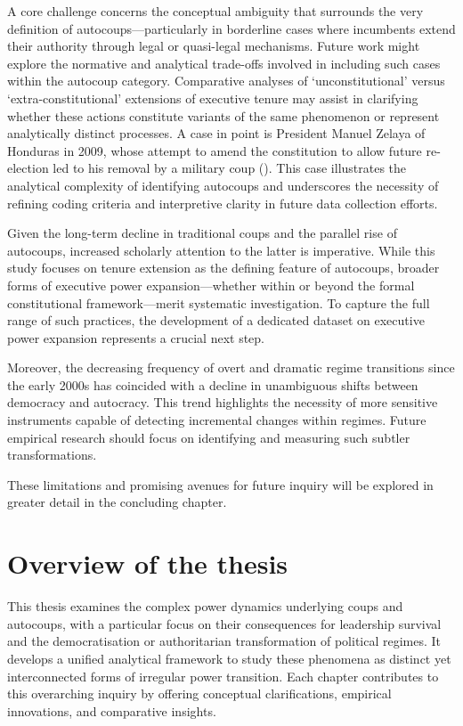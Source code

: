 \documentclass[
  12pt,
]{report}
\begin{document}
A core challenge concerns the conceptual ambiguity that surrounds the
very definition of autocoups---particularly in borderline cases where
incumbents extend their authority through legal or quasi-legal
mechanisms. Future work might explore the normative and analytical
trade-offs involved in including such cases within the autocoup
category. Comparative analyses of `unconstitutional' versus
`extra-constitutional' extensions of executive tenure may assist in
clarifying whether these actions constitute variants of the same
phenomenon or represent analytically distinct processes. A case in point
is President Manuel Zelaya of Honduras in 2009, whose attempt to amend
the constitution to allow future re-election led to his removal by a
military coup (). This case illustrates the analytical complexity of
identifying autocoups and underscores the necessity of refining coding
criteria and interpretive clarity in future data collection efforts.

Given the long-term decline in traditional coups and the parallel rise
of autocoups, increased scholarly attention to the latter is imperative.
While this study focuses on tenure extension as the defining feature of
autocoups, broader forms of executive power expansion---whether within
or beyond the formal constitutional framework---merit systematic
investigation. To capture the full range of such practices, the
development of a dedicated dataset on executive power expansion
represents a crucial next step.

Moreover, the decreasing frequency of overt and dramatic regime
transitions since the early 2000s has coincided with a decline in
unambiguous shifts between democracy and autocracy. This trend
highlights the necessity of more sensitive instruments capable of
detecting incremental changes within regimes. Future empirical research
should focus on identifying and measuring such subtler transformations.

These limitations and promising avenues for future inquiry will be
explored in greater detail in the concluding chapter.

\section{Overview of the thesis}\label{overview-of-the-thesis}

This thesis examines the complex power dynamics underlying coups and
autocoups, with a particular focus on their consequences for leadership
survival and the democratisation or authoritarian transformation of
political regimes. It develops a unified analytical framework to study
these phenomena as distinct yet interconnected forms of irregular power
transition. Each chapter contributes to this overarching inquiry by
offering conceptual clarifications, empirical innovations, and
comparative insights.
\end{document}
